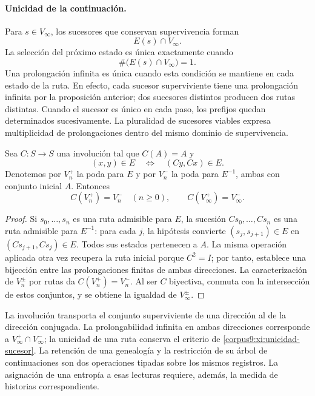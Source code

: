 \paragraph{Unicidad de la continuación.}
Para \(s\in V_\infty\), los sucesores que conservan supervivencia forman
\[
 E(s)\cap V_\infty.
\]
La selección del próximo estado es única exactamente cuando
\begin{equation}
 \#\bigl(E(s)\cap V_\infty\bigr)=1.
 \label{corpus9:xi:unicidad-sucesor}
\end{equation}
Una prolongación infinita es única cuando esta condición se mantiene
en cada estado de la ruta. En efecto, cada sucesor superviviente tiene
una prolongación infinita por la proposición anterior; dos sucesores
distintos producen dos rutas distintas. Cuando el sucesor es único en
cada paso, los prefijos quedan determinados sucesivamente.
La pluralidad de sucesores viables expresa multiplicidad de
prolongaciones dentro del mismo dominio de supervivencia.

\begin{proposition}
\label{corpus9:xi:conjugacion-supervivencia}
Sea \(C:S\to S\) una involución tal que \(C(A)=A\) y
\begin{equation}
 (x,y)\in E\quad\Longleftrightarrow\quad(Cy,Cx)\in E.
 \label{corpus9:xi:involucion-prolongaciones}
\end{equation}
Denotemos por \(V_n^+\) la poda para \(E\) y por \(V_n^-\) la poda
para \(E^{-1}\), ambas con conjunto inicial \(A\). Entonces
\[
 C(V_n^+)=V_n^-\quad(n\geq0),\qquad
 C(V_\infty^+)=V_\infty^-.
\]
\end{proposition}

\begin{proof}
Si \(s_0,\ldots,s_n\) es una ruta admisible para \(E\), la sucesión
\(Cs_0,\ldots,Cs_n\) es una ruta admisible para \(E^{-1}\):
para cada \(j\), la hipótesis convierte
\((s_j,s_{j+1})\in E\) en \((Cs_{j+1},Cs_j)\in E\).
Todos sus estados pertenecen a \(A\). La misma operación aplicada otra
vez recupera la ruta inicial porque \(C^2=I\); por tanto, establece una
bijección entre las prolongaciones finitas de ambas direcciones.
La caracterización de \(V_n^\pm\) por rutas da
\(C(V_n^+)=V_n^-\). Al ser \(C\) biyectiva, conmuta con la
intersección de estos conjuntos, y se obtiene la igualdad de
\(V_\infty^\pm\).
\end{proof}

La involución transporta el conjunto superviviente de una dirección al
de la dirección conjugada. La prolongabilidad infinita en ambas
direcciones corresponde a \(V_\infty^+\cap V_\infty^-\); la unicidad
de una ruta conserva el criterio de
\eqref{corpus9:xi:unicidad-sucesor}. La retención de una genealogía
y la restricción de su árbol de continuaciones son dos operaciones
tipadas sobre los mismos registros. La asignación de una entropía a
esas lecturas requiere, además, la medida de historias correspondiente.
